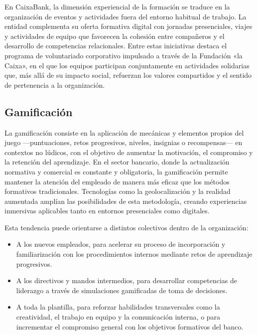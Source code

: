 En CaixaBank, la dimensión experiencial de la formación se traduce en la organización de eventos
y actividades fuera del entorno habitual de trabajo. La entidad complementa su oferta formativa
digital con jornadas presenciales, viajes y actividades de equipo que favorecen la cohesión entre
compañeros y el desarrollo de competencias relacionales. Entre estas iniciativas destaca el
programa de voluntariado corporativo impulsado a través de la Fundación «la Caixa», en el que
los equipos participan conjuntamente en actividades solidarias que, más allá de su impacto
social, refuerzan los valores compartidos y el sentido de pertenencia a la organización.

\subsection{Gamificación}

La gamificación consiste en la aplicación de mecánicas y elementos propios del juego
—puntuaciones, retos progresivos, niveles, insignias o recompensas— en contextos no lúdicos,
con el objetivo de aumentar la motivación, el compromiso y la retención del aprendizaje. En el
sector bancario, donde la actualización normativa y comercial es constante y obligatoria, la
gamificación permite mantener la atención del empleado de manera más eficaz que los métodos
formativos tradicionales. Tecnologías como la geolocalización y la realidad aumentada amplían
las posibilidades de esta metodología, creando experiencias inmersivas aplicables tanto en entornos
presenciales como digitales.

Esta tendencia puede orientarse a distintos colectivos dentro de la organización:

\begin{itemize}
    \item A los nuevos empleados, para acelerar su proceso de incorporación y familiarización
          con los procedimientos internos mediante retos de aprendizaje progresivos.
    \item A los directivos y mandos intermedios, para desarrollar competencias de liderazgo
          a través de simulaciones gamificadas de toma de decisiones.
    \item A toda la plantilla, para reforzar habilidades transversales como la creatividad,
          el trabajo en equipo y la comunicación interna, o para incrementar el compromiso
          general con los objetivos formativos del banco.
\end{itemize}

